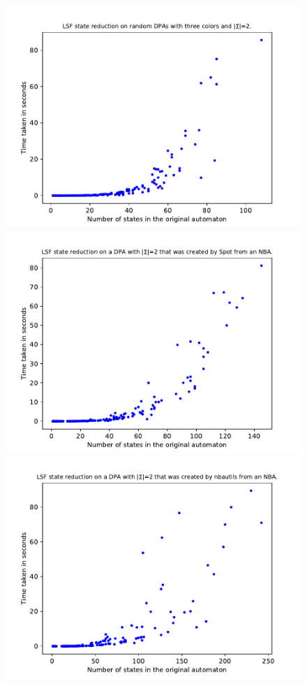 \begin{figure}
	\centering
	\begin{minipage}{0.49\textwidth}
		\includegraphics[page=6,height=.3\textheight]{../data/analysis/lsf/gendet_ap1.pdf} 
		\includegraphics[page=6,height=.3\textheight]{../data/analysis/lsf/detspot_ap1.pdf} 
		\includegraphics[page=6,height=.3\textheight]{../data/analysis/lsf/detnbaut_ap1.pdf} 

\end{minipage}
\end{figure}
